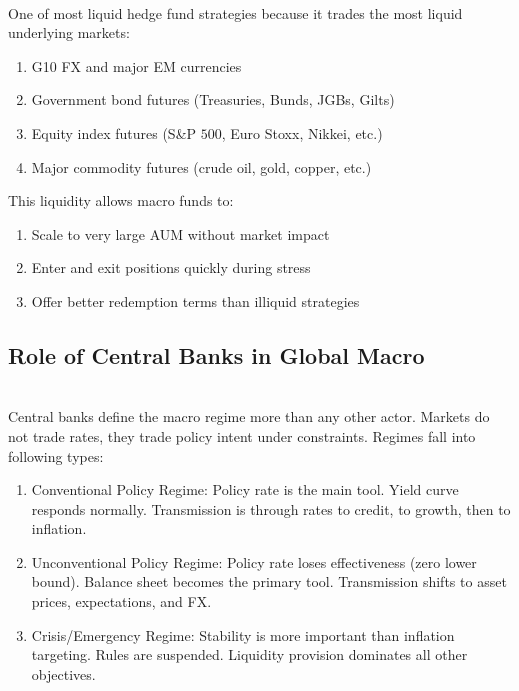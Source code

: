 \begin{remark} \\
One of most liquid hedge fund strategies because it trades the most liquid underlying markets:
\begin{enumerate}[label=\roman*.]
\setlength{\itemsep}{0pt}
\item G10 FX and major EM currencies
\item Government bond futures (Treasuries, Bunds, JGBs, Gilts)
\item Equity index futures (S\&P $500$, Euro Stoxx, Nikkei, etc.)
\item Major commodity futures (crude oil, gold, copper, etc.)
\end{enumerate}
This liquidity allows macro funds to:
\begin{enumerate}[label=\roman*.]
\setlength{\itemsep}{0pt}
\item Scale to very large AUM without market impact
\item Enter and exit positions quickly during stress
\item Offer better redemption terms than illiquid strategies
\end{enumerate}
\end{remark}

\subsection{Role of Central Banks in Global Macro}

\begin{remark} \\
Central banks define the macro regime more than any other actor. Markets do not trade rates, they trade policy intent under constraints. Regimes fall into following types:
\begin{enumerate}[label=\roman*.]
\setlength{\itemsep}{0pt}
\item Conventional Policy Regime: Policy rate is the main tool. Yield curve responds normally. Transmission is through rates to credit, to growth, then to inflation.
\item Unconventional Policy Regime: Policy rate loses effectiveness (zero lower bound). Balance sheet becomes the primary tool. Transmission shifts to asset prices, expectations, and FX.
\item Crisis/Emergency Regime: Stability is more important than inflation targeting. Rules are suspended. Liquidity provision dominates all other objectives.
\end{enumerate}
\end{remark}


